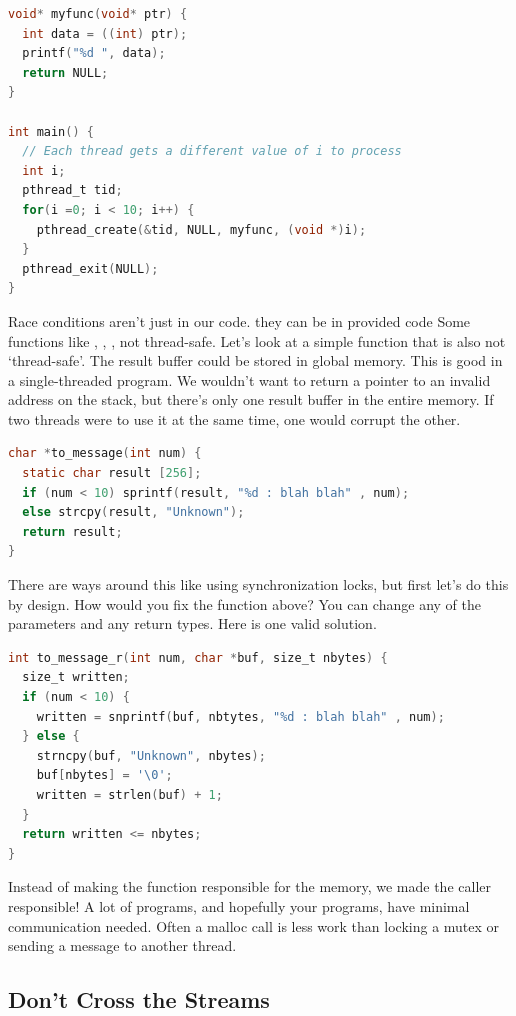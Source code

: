 \begin{lstlisting}[language=C]
void* myfunc(void* ptr) {
  int data = ((int) ptr);
  printf("%d ", data);
  return NULL;
}

int main() {
  // Each thread gets a different value of i to process
  int i;
  pthread_t tid;
  for(i =0; i < 10; i++) {
    pthread_create(&tid, NULL, myfunc, (void *)i);
  }
  pthread_exit(NULL);
}
\end{lstlisting}

Race conditions aren't just in our code.
they can be in provided code
Some functions like , , ,  not thread-safe.
Let's look at a simple function that is also not `thread-safe'.
The result buffer could be stored in global memory.
This is good in a single-threaded program.
We wouldn't want to return a pointer to an invalid address on the stack, but there's only one result buffer in the entire memory.
If two threads were to use it at the same time, one would corrupt the other.

\begin{lstlisting}[language=C]
char *to_message(int num) {
  static char result [256];
  if (num < 10) sprintf(result, "%d : blah blah" , num);
  else strcpy(result, "Unknown");
  return result;
}
\end{lstlisting}

There are ways around this like using synchronization locks, but first let's do this by design.
How would you fix the function above?
You can change any of the parameters and any return types.
Here is one valid solution.

\begin{lstlisting}[language=C]
int to_message_r(int num, char *buf, size_t nbytes) {
  size_t written;
  if (num < 10) {
    written = snprintf(buf, nbtytes, "%d : blah blah" , num);
  } else {
    strncpy(buf, "Unknown", nbytes);
    buf[nbytes] = '\0';
    written = strlen(buf) + 1;
  }
  return written <= nbytes;
}
\end{lstlisting}

Instead of making the function responsible for the memory, we made the caller responsible!
A lot of programs, and hopefully your programs, have minimal communication needed.
Often a malloc call is less work than locking a mutex or sending a message to another thread.

\subsection{Don't Cross the Streams}

